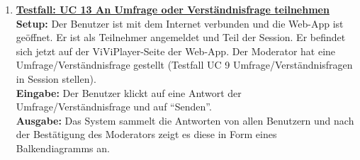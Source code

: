 \begin{enumerate}
	\item \underline{\textbf{Testfall: UC 13 An Umfrage oder Verständnisfrage teilnehmen}} \linebreak
	\textbf{Setup:} Der Benutzer ist mit dem Internet verbunden und die Web-App ist geöffnet. Er ist als Teilnehmer angemeldet und Teil der Session. Er befindet sich jetzt auf der ViViPlayer-Seite der Web-App. Der Moderator hat eine Umfrage/Verständnisfrage gestellt (Testfall UC 9 Umfrage/Verständnisfragen in Session stellen).\\
	\textbf{Eingabe:} Der Benutzer klickt auf eine Antwort der Umfrage/Verständnisfrage und auf ``Senden''.\\
	\textbf{Ausgabe:} Das System sammelt die Antworten von allen Benutzern und nach der Bestätigung des Moderators zeigt es diese in Form eines Balkendiagramms an.
	
	
	
\end{enumerate}
